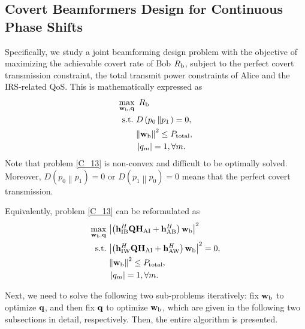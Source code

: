 \documentclass[10pt,journal,letterpaper,twocolumn,twoside]{IEEEtran} %
\begin{document}
 \subsection{Covert Beamformers  Design for Continuous Phase Shifts}
Specifically, we study a joint  beamforming  design problem with the objective of maximizing
  the achievable covert  rate of Bob  ${R_{\rm{b}}}$, subject to the   perfect covert transmission constraint, the total transmit power constraints of Alice and the IRS-related QoS. This is mathematically expressed as
\begin{subequations}\label{C_13}
\begin{align}
\mathop {\max }\limits_{{{\bf{w}}_{\rm{b}}},{\bf{q}}} {\rm{ }}&~{R_{\rm{b}}} \hfill \\
  {\text{s}}{\text{.t}}{\text{.}}~&D\left( {{p_0}\left\| {{p_1}} \right.} \right)= 0, \hfill \label{C_10}\\
 & {\left\| {{{\mathbf{w}}_{\rm{b}}}} \right\|^2} \le  {P_{{\rm{total}}}}, \hfill \\
 &\left| {{q_m}} \right| = 1,\forall m.
  \end{align}
\end{subequations}
  Note that problem \eqref{C_13} is   non-convex and  difficult to be optimally solved.
Moreover,      $D\left( {{p_0}\left\| {{p_1}} \right.} \right)=0$ or $D\left( {{p_1}\left\| {{p_0}} \right.} \right)=0$ means  that the  perfect covert transmission.



 Equivalently,
   problem \eqref{C_13} can be reformulated as
   \begin{subequations}\label{C_14}
\begin{align}
 \mathop {\max }\limits_{{{\mathbf{w}}_{\rm{b}}},{\bf{q}}} ~&{\left| {\left( {{\bf{h}}_{{\rm{IB}}}^H{\bf{Q}}{{\bf{H}}_{{\rm{AI}}}} + {\bf{h}}_{{\rm{AB}}}^H} \right){{\bf{w}}_{\rm{b}}}} \right|^2}\label{C_14a} \\
 {\rm{s.t.}}~&{\left| {\left( {{\bf{h}}_{{\rm{IW}}}^H{\bf{Q}}{{\bf{H}}_{{\rm{AI}}}} + {\bf{h}}_{{\rm{AW}}}^H} \right){{\bf{w}}_{\rm{b}}}} \right|^{\rm{2}}} = 0, \label{C_14b}\\
 & {\left\| {{{\mathbf{w}}_{\rm{b}}}} \right\|^2} \le  {P_{{\rm{total}}}}, \hfill \label{C_14c}\\
 &\left| {{q_m}} \right| = 1,\forall m.\label{C_14d}
 \end{align}
\end{subequations}

Next,  we need to solve the following two sub-problems iteratively: fix ${{\mathbf{w}}_{\rm{b}}}$ to optimize ${\bf{q}}$, and then fix ${\bf{q}}$ to optimize ${{\mathbf{w}}_{\rm{b}}}$,  which are given in the following two subsections in detail, respectively. Then, the entire algorithm is presented.
\end{document}

